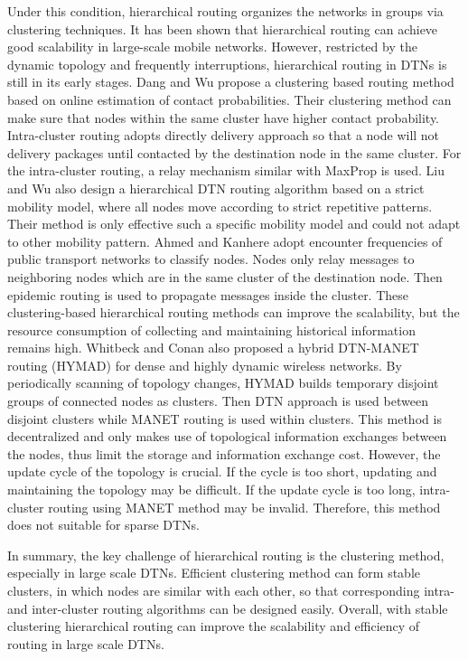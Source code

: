 \documentclass[conference]{IEEEtran}
\begin{document}
Under this condition, hierarchical routing organizes the networks in groups via clustering techniques. It has been shown that hierarchical routing can achieve good scalability in large-scale mobile networks. However, restricted by the dynamic topology and frequently interruptions, hierarchical routing in DTNs is still in its early stages. Dang and Wu \cite{DangWu-784} propose a clustering based routing method based on online estimation of contact probabilities. Their clustering method can make sure that nodes within the same cluster have higher contact probability. Intra-cluster routing adopts directly delivery approach so that a node will not delivery packages until contacted by the destination node in the same cluster. For the intra-cluster routing, a relay mechanism similar with MaxProp is used.
Liu and Wu \cite{lLiuWu-1103} also design a hierarchical DTN routing algorithm based on a strict mobility model, where all nodes move according to strict repetitive patterns. Their method is only effective such a specific mobility model and could not adapt to other mobility pattern. Ahmed and Kanhere \cite{mAhmedKanhere-14} adopt encounter frequencies of public transport networks to classify nodes. Nodes only relay messages to neighboring nodes which are in the same cluster of the destination node. Then epidemic routing is used to propagate messages inside the cluster. These clustering-based hierarchical routing methods can improve the scalability, but
the resource consumption of collecting and maintaining historical information remains high.
Whitbeck and Conan \cite{oWhitbeckConan-16} also proposed a hybrid DTN-MANET routing
(HYMAD) for dense and highly dynamic wireless networks. By periodically scanning of topology changes,
HYMAD builds temporary disjoint groups of connected nodes as clusters. Then DTN approach is used between
disjoint clusters while MANET routing is used within clusters. This method is decentralized and only makes use of topological information exchanges between the nodes, thus limit the storage and information exchange cost.
However,  the update cycle of the topology is crucial. If the cycle is too short,  updating and maintaining the topology may be difficult. If the update cycle is too long, intra-cluster routing using MANET method may be invalid. Therefore, this method does not suitable for sparse DTNs.

In summary, the key challenge of hierarchical routing is the clustering method, especially in large scale DTNs. Efficient clustering method can form stable clusters, in which nodes are similar with each other, so that corresponding intra- and inter-cluster routing algorithms can be designed easily. Overall, with stable clustering hierarchical routing can improve the scalability and efficiency of routing in large scale DTNs.
\end{document}
